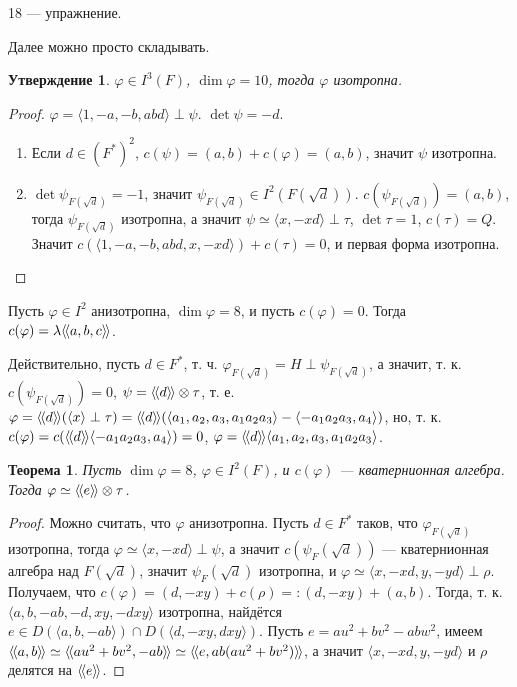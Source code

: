 \documentclass{article}
\newenvironment{enum}[2][\parindent]{\begin{enumerate}[nosep, wide, labelindent = #1, label = #2]}{\end{enumerate}}
\newtheorem*{theorem}{Теорема}
\newtheorem*{statement}{Утверждение}
\theoremstyle{definition}
\theoremstyle{remark}
\newcommand{\llangle}{\langle \hspace{-.5mm} \langle}
\newcommand{\rrangle}{\rangle \hspace{-.5mm} \rangle}
\begin{document}
18 --- упражнение.

Далее можно просто складывать.

\begin{statement}
    $\varphi \in I^3(F)$, $\dim \varphi = 10$, тогда $\varphi$ изотропна.
\end{statement}
\begin{proof}
    $\varphi = \langle 1, -a, -b, abd \rangle \perp \psi$. $\det \psi = -d$.
    \begin{enum}{\arabic*)}
        \item Если $d \in (F^*)^2$, $c(\psi) = (a, b) + c(\varphi) = (a, b)$, значит $\psi$ изотропна.
        \item $\det \psi_{F(\sqrt{d})} = -1$, значит $\psi_{F(\sqrt{d})} \in I^2(F(\sqrt{d}))$. $c(\psi_{F(\sqrt{d})}) = (a, b)$, тогда $\psi_{F(\sqrt{d})}$ изотропна, а значит $\psi \simeq \langle x, -xd \rangle \perp \tau$, $\det \tau = 1$, $c(\tau) = Q$. Значит $c(\langle 1, -a, -b, abd, x, -xd \rangle) + c(\tau) = 0$, и первая форма изотропна.
    \end{enum}
\end{proof}

Пусть $\varphi \in I^2$ анизотропна, $\dim \varphi = 8$, и пусть $c(\varphi) = 0$. Тогда $c(\varphi) = \lambda\llangle a, b, c \rrangle$.

Действительно, пусть $d \in F^*$, т. ч. $\varphi_{F(\sqrt{d})} = H \perp \psi_{F(\sqrt{d})}$, а значит, т. к. $c(\psi_{F(\sqrt{d})}) = 0$, $\psi = \llangle d \rrangle \otimes \tau$, т. е. $\varphi = \llangle d \rrangle(\langle x \rangle \perp \tau) = \llangle d \rrangle(\langle a_1, a_2, a_3, a_1a_2a_3 \rangle - \langle -a_1a_2a_3, a_4 \rangle)$, но, т. к. $c(\varphi) = c(\llangle d \rrangle \langle -a_1a_2a_3, a_4 \rangle) = 0$, $\varphi = \llangle d \rrangle\langle a_1, a_2, a_3, a_1a_2a_3 \rangle$.

\begin{theorem}
    Пусть $\dim \varphi = 8$, $\varphi \in I^2(F)$, и $c(\varphi)$ --- кватернионная алгебра. Тогда $\varphi \simeq \llangle e \rrangle \otimes \tau$.
\end{theorem}
\begin{proof}
    Можно считать, что $\varphi$ анизотропна. Пусть $d \in F^*$ таков, что $\varphi_{F(\sqrt{d})}$ изотропна, тогда $\varphi \simeq \langle x, -xd \rangle \perp \psi$, а значит $c(\psi_F(\sqrt{d}))$ --- кватернионная алгебра над $F(\sqrt{d})$, значит $\psi_F(\sqrt{d})$ изотропна, и $\varphi \simeq \langle x, -xd, y, -yd \rangle \perp \rho$. Получаем, что $c(\varphi) = (d, -xy) + c(\rho) =: (d, -xy) + (a, b)$. Тогда, т. к. $\langle a, b, -ab, -d, xy, -dxy \rangle$ изотропна, найдётся $e \in D(\langle a, b, -ab \rangle) \cap D(\langle d, -xy, dxy\rangle)$. Пусть $e = au^2 + bv^2 - abw^2$, имеем $\llangle a, b \rrangle \simeq \llangle au^2 + bv^2, -ab \rrangle \simeq \llangle e, ab(au^2 + bv^2) \rrangle$, а значит $\langle x, -xd, y, -yd \rangle$ и $\rho$ делятся на $\llangle e \rrangle$.
\end{proof}
\end{document}

